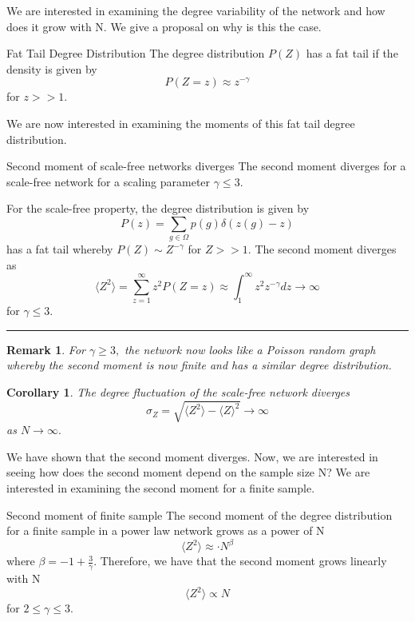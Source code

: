 \documentclass[twoside]{article}
\newtheorem{corollary}[theorem]{Corollary}
\newtheorem{remark}[theorem]{Remark}
\newenvironment{proof}{{\bf Proof:}}{\hfill\rule{2mm}{2mm}}
\begin{document}
We are interested in examining the degree variability of the network and how does it grow with N. We give a proposal on why is this the case.

\begin{definition_exam}{Fat Tail Degree Distribution}{} The degree distribution $P(Z)$ has a fat tail if the density is given by 
$$
P(Z = z) \approx z^{-\gamma}
$$
for $z >> 1.$
\end{definition_exam}

We are now interested in examining the moments of this fat tail degree distribution.

\begin{proposition_exam}{Second moment of scale-free networks diverges}{} The second moment diverges for a scale-free network for a scaling parameter $\gamma \leq 3.$
\end{proposition_exam}
\begin{proof}
For the scale-free property, the degree distribution is given by
$$
P(z) = \sum_{g \in \Omega}p(g)\delta (z(g) - z)
$$
has a fat tail whereby $P(Z) \sim Z^{-\gamma}$ for $Z >> 1.$ The second moment diverges as
$$
\langle Z^2 \rangle = \sum_{z=1}^{\infty}z^2P(Z = z) \approx \int_{1}^{\infty}z^2z^{-\gamma}dz \rightarrow \infty
$$
for $\gamma \leq 3.$
\end{proof}
\begin{remark} For $\gamma \geq 3,$ the network now looks like a Poisson random graph whereby the second moment is now finite and has a similar degree distribution.
\end{remark}

\begin{corollary}The degree fluctuation of the scale-free network diverges $$\sigma_Z = \sqrt{\langle Z^2 \rangle - \langle Z \rangle^2} \rightarrow \infty$$ as $N \rightarrow \infty.$
\end{corollary}

We have shown that the second moment diverges. Now, we are interested in seeing how does the second moment depend on the sample size N? We are interested in examining the second moment for a finite sample.

\begin{proposition_exam}{Second moment of finite sample}{} The second moment of the degree distribution for a finite sample in a power law network grows as a power of N 
$$
\langle Z^2 \rangle \approx \cdot N^{\beta}
$$
where $\beta = -1 + \frac{3}{\gamma}.$ Therefore, we have that the second moment grows linearly with N
$$
\langle Z^2 \rangle \propto N
$$
for $2 \leq \gamma \leq 3$.
\end{proposition_exam}
\end{document}
